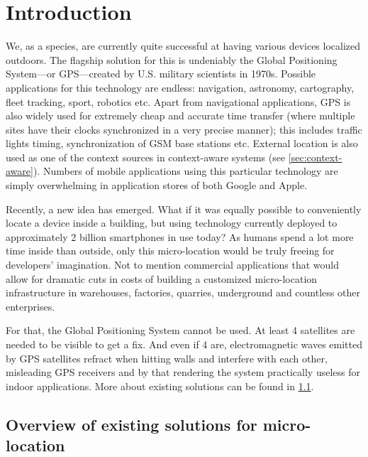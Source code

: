 \chapter{Introduction}
\label{cha:introduction}



We, as a species, are currently quite successful at having various devices localized outdoors. The flagship solution for this is undeniably the Global Positioning System---or GPS---created by U.S. military scientists in 1970s. Possible applications for this technology are endless: navigation, astronomy, cartography, fleet tracking, sport, robotics etc. Apart from navigational applications, GPS is also widely used for extremely cheap and accurate time transfer (where multiple sites have their clocks synchronized in a very precise manner); this includes traffic lights timing, synchronization of GSM base stations etc. External location is also used as one of the context sources in context-aware systems (see \cref{sec:context-aware}). Numbers of mobile applications using this particular technology are simply overwhelming in application stores of both Google and Apple.

Recently, a new idea has emerged. What if it was equally possible to conveniently locate a device inside a building, but using technology currently deployed to approximately 2 billion smartphones in use today? As humans spend a lot more time inside than outside, only this micro-location would be truly freeing for developers' imagination. Not to mention commercial applications that would allow for dramatic cuts in costs of building a customized micro-location infrastructure in warehouses, factories, quarries, underground and countless other enterprises.


For that, the Global Positioning System cannot be used. At least 4 satellites are needed to be visible to get a fix. And even if 4 are, electromagnetic waves emitted by GPS satellites refract when hitting walls and interfere with each other, misleading GPS receivers and by that rendering the system practically useless for indoor applications. More about existing solutions can be found in \cref{sec:existing-uloc}.

\section{Overview of existing solutions for micro-location}
\label{sec:existing-uloc}

